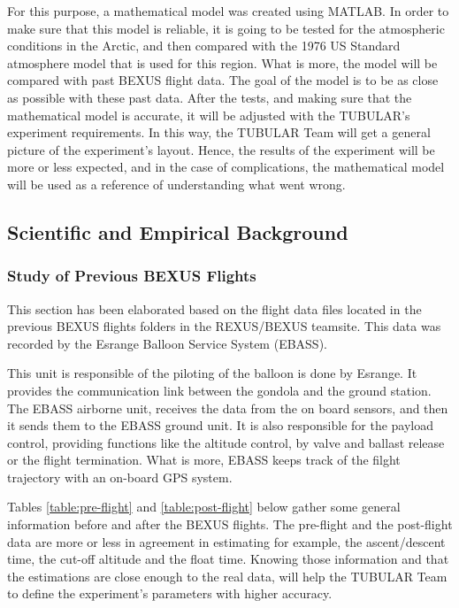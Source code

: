 \documentclass[a4paper,12pt,twoside]{article}
\begin{document}
\begin{appendices}
For this purpose, a mathematical model was created using MATLAB. In order to make sure that this model is reliable, it is going to be tested for the atmospheric conditions in the Arctic, and then compared with the 1976 US Standard atmosphere model that is used for this region. What is more, the model will be compared with past BEXUS flight data. The goal of the model is to be as close as possible with these past data. 
After the tests, and making sure that the mathematical model is accurate, it will be adjusted with the TUBULAR's experiment requirements. In this way, the TUBULAR Team will get a general picture of the experiment's layout. Hence, the results of the experiment will be more or less expected, and in the case of complications, the mathematical model will be used as a reference of understanding what went wrong.


\subsection{Scientific and Empirical Background}

\subsubsection{Study of Previous BEXUS Flights}
This section has been elaborated based on the flight data files located in the previous BEXUS flights folders in the REXUS/BEXUS teamsite. This data was recorded by the Esrange Balloon Service System (EBASS).

\smallskip
This unit is responsible of the piloting of the balloon is done by Esrange. It provides the communication link between the gondola and the ground station. The EBASS airborne unit, receives the data from the on board sensors, and then it sends them to the EBASS ground unit. It is also responsible for the payload control, providing functions like the altitude control, by valve and ballast release or the flight termination. What is more, EBASS keeps track of the filght trajectory with an on-board GPS system.

\smallskip
Tables \ref{table:pre-flight} and \ref{table:post-flight} below gather some general information before and after the BEXUS flights. The pre-flight and the post-flight data are more or less in agreement in estimating for example, the ascent/descent time, the cut-off altitude and the float time. Knowing those information and that the estimations are close enough to the real data, will help the TUBULAR Team to define the experiment's parameters with higher accuracy. 


\end{appendices}
\end{document}
